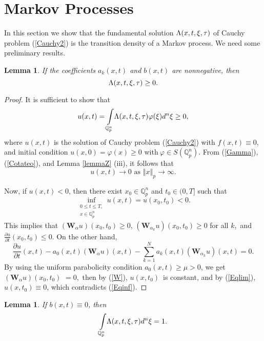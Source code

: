 \documentclass{amsart}\usepackage{amsfonts}
\theoremstyle{plain}
\newtheorem{lemma}[theorem]{Lemma}
\numberwithin{equation}{section}
\begin{document}
\section{\label{sect6}Markov Processes}

In this section we show that the fundamental solution ${\LARGE \Lambda
}(x,t,\xi,\tau)$ of Cauchy problem (\ref{Cauchy2}) is the transition density
of a Markov process. We need some preliminary results.

\begin{lemma}
\label{lemma1_mp}If the coefficients $a_{k}(x,t)$ and $b(x,t)$ are
nonnegative, then\[
{\LARGE \Lambda}(x,t,\xi,\tau)\geq0.
\]

\end{lemma}

\begin{proof}
It is sufficient to show that\[
u(x,t)={\displaystyle\int\limits_{\mathbb{Q}_{p}^{n}}}
{\LARGE \Lambda}(x,t,\xi,\tau)\varphi(\xi)d^{n}\xi\geq0,
\]
where $u(x,t)$ is the solution of Cauchy problem (\ref{Cauchy2}) with
$f(x,t)\equiv0$, and initial condition $u(x,0)=\varphi(x)\geq0$ with$\ \varphi
\in S(\mathbb{Q}_{p}^{n})$. From (\ref{Gamma}), (\ref{Cotateo}), and Lemma
\ref{lemmaZ} (iii), it follows that
\begin{equation}
u(x,t)\rightarrow0\text{ as }\left\Vert x\right\Vert _{p}\rightarrow\infty.
\label{Eqlim}\end{equation}


Now, if $u(x,t)<0$, then there exist $x_{0}\in\mathbb{Q}_{p}^{n}$ and
$t_{0}\in(0,T]$ such that\begin{equation}
\inf_{\substack{0\leq t\leq T,\\x\in\mathbb{Q}_{p}^{n}}}u\left(  x,t\right)
=u(x_{0},t_{0})<0. \label{Eqinf}\end{equation}
This implies that $(\mathbf{W}_{\alpha}u)(x_{0},t_{0})\geq0$, $(\mathbf{W}_{\alpha_{k}}u)(x_{0},t_{0})\geq0$ for all $k$,\ and $\frac{\partial
u}{\partial t}(x_{0},t_{0})\leq0$. On the other hand,
\[
\frac{\partial u}{\partial t}(x,t)-a_{0}(x,t)(\boldsymbol{\mathbf{W}}_{\alpha
}u)(x,t)-\sum_{k=1}^{N}a_{k}(x,t)(\boldsymbol{\mathbf{W}}_{\alpha_{k}}u)(x,t)=0.
\]
By using the uniform parabolicity condition $a_{0}(x,t)\geq\mu>0$, we get
$(\mathbf{W}_{\alpha}u)(x_{0},t_{0})$ $=0$,\ then by (\ref{W}), $u(x,t_{0})$\ is constant, and by (\ref{Eqlim}), $u(x,t_{0})\equiv0$, which contradicts
(\ref{Eqinf}).
\end{proof}

\begin{lemma}
\label{lemma2_mp}If $b(x,t)\equiv0$, then\[{\displaystyle\int\limits_{\mathbb{Q}_{p}^{n}}}
{\LARGE \Lambda}(x,t,\xi,\tau)d^{n}\xi=1.
\]

\end{lemma}
\end{document}
